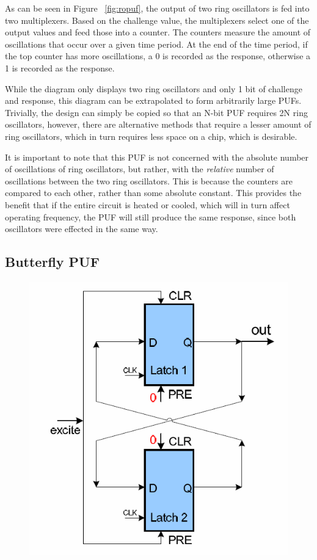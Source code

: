 As can be seen in Figure ~\ref{fig:ropuf}, the output of two ring oscillators is
fed into two multiplexers. Based on the challenge value, the multiplexers select
one of the output values and feed those into a counter. The counters measure the amount
of oscillations that occur over a given time period. At the end of the time period,
if the top counter has more oscillations, a 0 is recorded as the response, otherwise
a 1 is recorded as the response.

While the diagram only displays two ring oscillators and only 1 bit of challenge and
response, this diagram can be extrapolated to form arbitrarily large PUFs. Trivially,
the design can simply be copied so that an N-bit PUF requires 2N ring oscillators,
however, there are alternative methods that require a lesser amount of ring oscillators,
which in turn requires less space on a chip, which is desirable.

It is important to note that this PUF is not concerned with the absolute number of oscillations
of ring oscillators, but rather, with the \emph{relative} number of oscillations between
the two ring oscillators. This is because the counters are compared to each other, rather than
some absolute constant. This provides the benefit that if the entire circuit is heated or cooled,
which will in turn affect operating frequency, the PUF will still produce the same response, since
both oscillators were effected in the same way.

\subsection{Butterfly PUF}

\begin{figure}[h]
\includegraphics[width=500px]{images/butterflypuf.png}
\end{figure}


